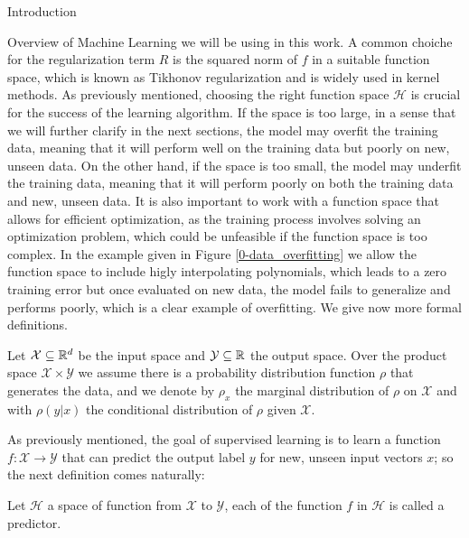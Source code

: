 \begin{chapter}{Introduction}
\begin{section}{Overview of Machine Learning }
  we will be using in this work. A common choiche for the regularization term $R$ is the squared norm of $f$ in a suitable function space, which is known as Tikhonov regularization and is widely used in kernel methods.
  \vspace{5pt}
  \newline As previously mentioned, choosing the right function space $\mathcal{H}$ is crucial for the success of the learning algorithm.
  If the space is too large, in a sense that we will further clarify in the next sections, the model may overfit the training data, meaning that it will perform well on the training data but poorly on new, unseen data.
  On the other hand, if the space is too small, the model may underfit the training data, meaning that it will perform poorly on both the training data and new, unseen data.
  It is also important to work with a function space that allows for efficient optimization, as the training process involves solving an optimization problem, which could be unfeasible if the function space is too complex.
  In the example given in Figure \ref{0-data_overfitting} we allow the function space to include higly interpolating polynomials, which leads
  to a zero training error but once evaluated on new data, the model fails to generalize and performs poorly, which is a clear example of overfitting.
  \vspace{5pt}
  \newline We give now more formal definitions.
  \begin{definition}
      Let $\mathcal{X} \subseteq \mathbb{R}^d $ be the input space and $\mathcal{Y} \subseteq \mathbb{R}$ the output space. Over the
      product space $\mathcal{X} \times \mathcal{Y}$ we assume there is a probability distribution function $\rho$ that generates the data, and we denote by $\rho_x$ the marginal distribution of $\rho$ on $\mathcal{X}$
      and with $\rho(y|x)$ the conditional distribution of $\rho$ given $\mathcal{X}$.
  \end{definition}
  As previously mentioned, the goal of supervised learning is to learn a function \newline $f: \mathcal{X} \rightarrow \mathcal{Y}$ that can predict the output label $y$ for new, unseen input vectors $x$;
  so the next definition comes naturally:
  \begin{definition}
      Let $\mathcal{H}$ a space of function from $\mathcal{X}$ to $\mathcal{Y}$, each of the function $f$ in $\mathcal{H}$ is called a predictor.
  \end{definition}

\end{section}
\end{chapter}
